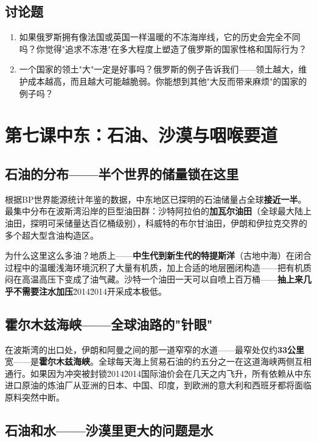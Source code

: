 \documentclass[a4paper,12pt]{ctexart}
\begin{document}
\subsection*{讨论题}
\begin{enumerate}
  \item 如果俄罗斯拥有像法国或英国一样温暖的不冻海岸线，它的历史会完全不同吗？你觉得"追求不冻港"在多大程度上塑造了俄罗斯的国家性格和国际行为？
  \item 一个国家的领土"大"一定是好事吗？俄罗斯的例子告诉我们——领土越大，维护成本越高，而且越大可能越脆弱。你能想到其他"大反而带来麻烦"的国家的例子吗？
\end{enumerate}

\newpage

\section{\textcolor{orange!80!black}{第七课\quad 中东：石油、沙漠与咽喉要道}}

\subsection*{石油的分布——半个世界的储量锁在这里}

根据BP世界能源统计年鉴的数据，中东地区已探明的石油储量占全球\textbf{接近一半}。最集中分布在波斯湾沿岸的巨型油田群：沙特阿拉伯的\textbf{加瓦尔油田}（全球最大陆上油田，探明可采储量达百亿桶级别），科威特的布尔甘油田，伊朗和伊拉克交界的多个超大型含油构造区。

为什么这里这么多油？地质上——\textbf{中生代到新生代的特提斯洋}（古地中海）在闭合过程中的温暖浅海环境沉积了大量有机质，加上合适的地层圈闭构造——把有机质闷在高温高压下变成了油气藏。沙特一个油田一天可以自喷上百万桶——\textbf{抽上来几乎不需要注水加压}\u2014\u2014开采成本极低。

\subsection*{霍尔木兹海峡——全球油路的"针眼"}

在波斯湾的出口处，伊朗和阿曼之间的那一道窄窄的水道——最窄处仅约\textbf{33公里}宽——是\textbf{霍尔木兹海峡}。全球每天海上贸易石油的约五分之一在这道海峡两侧互相通行。如果因为冲突被封锁\u2014\u2014国际油价会在几天之内飞升，所有依赖从中东进口原油的炼油厂从亚洲的日本、中国、印度，到欧洲的意大利和西班牙都将面临原料突然中断。

\subsection*{石油和水——沙漠里更大的问题是水}
\end{document}
